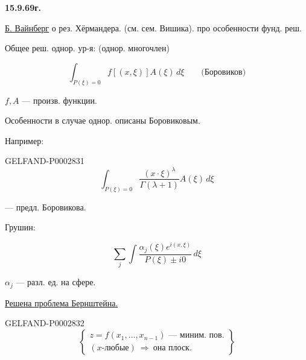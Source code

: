 \textbf{15.9.69г.}

\underline{\underline{Б. Вайнберг}} о рез. Хёрмандера. (см. сем. Вишика). про особенности фунд. реш.

Общее реш. однор. ур-я: (однор. многочлен)

\begin{equation*}\int_{P(\xi)=0}f[(x,\xi)]A(\xi)\,d\xi\qquad\text{(Боровиков)}\end{equation*}

$f,A$ — произв. функции.

Особенности в случае однор. описаны Боровиковым.

Например:

\begin{GelfandAdjacentEvidence}{GELFAND-P000283}{1}
\begin{equation*}\int_{P(\xi)=0}\frac{(x\cdot\xi)^\lambda}{\Gamma(\lambda+1)}A(\xi)\,d\xi\end{equation*}

\end{GelfandAdjacentEvidence}


— предл. Боровикова.

\begin{center}\end{center}





Грушин:

\begin{equation*}\sum_j\int\frac{\alpha_j(\xi)e^{i(x,\xi)}}{P(\xi)\pm i0}\,d\xi\end{equation*}

$\alpha_j$ — разл. ед. на сфере.





\underline{Решена проблема Бернштейна.}

\begin{GelfandAdjacentEvidence}{GELFAND-P000283}{2}
\begin{equation*}\left\{\begin{gathered}
z=f(x_1,\ldots,x_{n-1})\text{ — миним. пов.}\\
(x\text{-любые})\ \Longrightarrow\ \text{она плоск.}
\end{gathered}\right\}\end{equation*}

\end{GelfandAdjacentEvidence}


